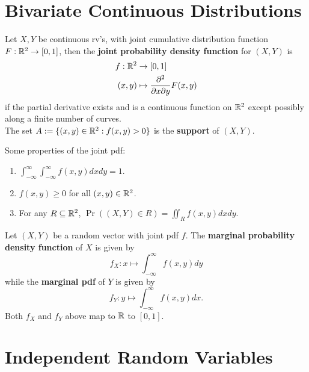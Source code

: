 \documentclass[11pt,fleqn]{book} %
\begin{document}

\section{Bivariate Continuous Distributions}

\begin{definition} 
Let \(X, Y\) be continuous rv's, with joint cumulative distribution function \(F:\mathbb{R}^2 \rightarrow[0, 1]\), then the \textbf{joint probability density function} for \((X, Y)\) is
\[
\begin{aligned}
f:\mathbb{R}^2 &\rightarrow [0, 1] \\
(x, y) &\mapsto \frac{\partial^2}{\partial x\partial y} F(x, y)
\end{aligned}
\]
if the partial derivative exists and is a continuous function on \(\mathbb{R}^2\) except possibly along a finite number of curves.\\
\indent The set \(A := \{(x, y) \in \mathbb{R}^2: f(x, y) > 0\}\) is the \textbf{support} of \((X, Y)\).
\end{definition}

\begin{remark} Some properties of the joint pdf:
\begin{enumerate}
\item \(\int_{-\infty}^\infty\int_{-\infty}^\infty f(x, y)dxdy = 1\).
\item \(f(x, y) \geq 0\) for all \((x, y) \in \mathbb{R}^2\).
\item For any \(R \subseteq \mathbb{R}^2\), \(\Pr((X, Y) \in R) = \iint_R f(x, y)dxdy\).
\end{enumerate}
\end{remark}

\begin{definition} \label{def:233}
Let \((X, Y)\) be a random vector with joint pdf \(f\). The \textbf{marginal probability density function} of \(X\) is given by
\[
f_X: x\mapsto \int_{-\infty}^\infty f(x, y)dy
\]
while the \textbf{marginal pdf} of \(Y\) is given by
\[
f_Y: y\mapsto \int_{-\infty}^\infty f(x, y)dx.
\]
\indent Both \(f_X\) and \(f_Y\) above map to \(\mathbb{R}\) to \([0, 1]\).
\end{definition}


\section{Independent Random Variables}
\end{document}
